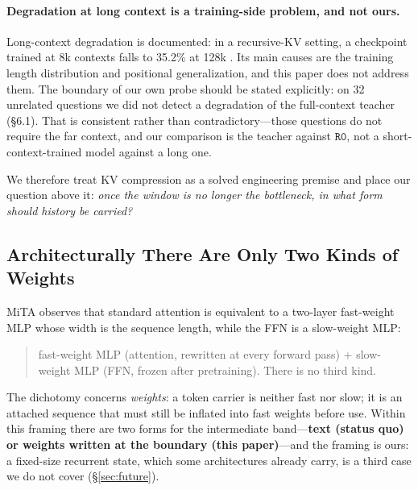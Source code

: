 \documentclass[sigconf,nonacm]{acmart}
\newcommand{\armR}{\texttt{R0}}
\begin{document}
\paragraph{Degradation at long context is a training-side problem, and not ours.} Long-context degradation
is documented: in a recursive-KV setting, a checkpoint trained at 8k contexts falls to 35.2\% at 128k
\cite{still2026}. Its main causes are the training length distribution and positional generalization, and
this paper does not address them. The boundary of our own probe should be stated explicitly: on 32
unrelated questions we did not detect a degradation of the full-context teacher (\S6.1). That is
consistent rather than contradictory---those questions do not require the far context, and our comparison
is the teacher against $\armR$, not a short-context-trained model against a long one.

We therefore treat KV compression as a solved engineering premise and place our question above it:
\emph{once the window is no longer the bottleneck, in what form should history be carried?}

\subsection{Architecturally There Are Only Two Kinds of Weights}
MiTA \cite{mita2026,schlag2021} observes that standard attention is equivalent to a two-layer fast-weight
MLP whose width is the sequence length, while the FFN is a slow-weight MLP:
\begin{quote}
fast-weight MLP (attention, rewritten at every forward pass) \;+\; slow-weight MLP (FFN, frozen after
pretraining). There is no third kind.
\end{quote}
The dichotomy concerns \emph{weights}: a token carrier is neither fast nor slow; it is an attached
sequence that must still be inflated into fast weights before use. Within this framing there are two forms for
the intermediate band---\textbf{text (status quo) or weights written at the boundary (this paper)}---and the
framing is ours: a fixed-size recurrent state, which some architectures already carry, is a third case we do not
cover (\S\ref{sec:future}).
\end{document}
